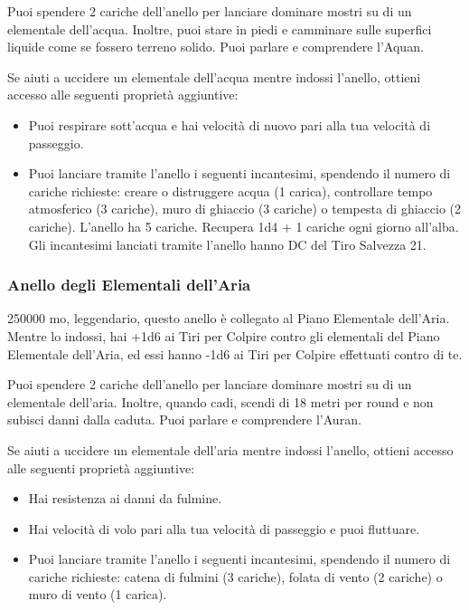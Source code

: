 \begin{multicols}{2}
Puoi spendere 2 cariche dell'anello per lanciare dominare mostri su di un elementale dell'acqua. Inoltre, puoi stare in piedi e camminare sulle superfici liquide come se fossero terreno solido. Puoi parlare e comprendere l'Aquan.

Se aiuti a uccidere un elementale dell'acqua mentre indossi l'anello, ottieni accesso alle seguenti proprietà aggiuntive:

\medskip

\begin{itemize}
\item
Puoi respirare sott'acqua e hai velocità di nuovo pari alla tua velocità di passeggio.
\item
Puoi lanciare tramite l'anello i seguenti incantesimi, spendendo il numero di cariche richieste: creare o distruggere acqua (1 carica), controllare tempo atmosferico (3 cariche), muro di ghiaccio (3 cariche) o tempesta di ghiaccio (2 cariche).
L'anello ha 5 cariche. Recupera 1d4 + 1 cariche ogni giorno all'alba. Gli incantesimi lanciati tramite l'anello hanno DC del Tiro Salvezza 21.

\end{itemize}

\subsubsection*{Anello degli Elementali dell'Aria}
250000 mo, leggendario, questo anello è collegato al Piano Elementale dell'Aria. Mentre lo indossi, hai +1d6 ai Tiri per Colpire contro gli elementali del Piano Elementale dell'Aria, ed essi hanno -1d6 ai Tiri per Colpire effettuati contro di te.

Puoi spendere 2 cariche dell'anello per lanciare dominare mostri su di un elementale dell'aria. Inoltre, quando cadi, scendi di 18 metri per round e non subisci danni dalla caduta. Puoi parlare e comprendere l'Auran.

Se aiuti a uccidere un elementale dell'aria mentre indossi l'anello, ottieni accesso alle seguenti proprietà aggiuntive:

\medskip

\begin{itemize}
\item
Hai resistenza ai danni da fulmine.
\item
Hai velocità di volo pari alla tua velocità di passeggio e puoi fluttuare.
\item
Puoi lanciare tramite l'anello i seguenti incantesimi, spendendo il numero di cariche richieste: catena di fulmini (3 cariche), folata di vento (2 cariche) o muro di vento (1 carica).
\end{itemize}
\medskip


\end{multicols}
